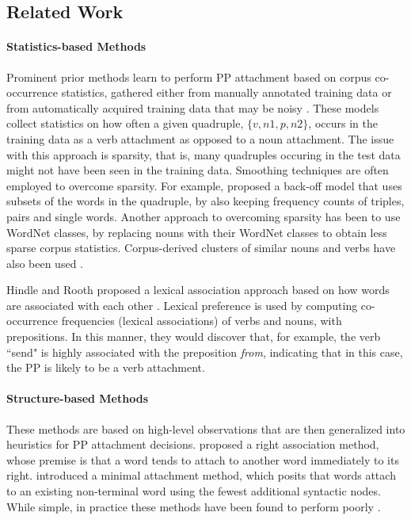\subsection{Related Work}
\paragraph{Statistics-based Methods}
Prominent  prior methods learn to perform PP attachment based on corpus co-occurrence statistics,  gathered either from  manually annotated training data \cite{Collins95,BrillR94} or from  automatically acquired  training data that may be noisy \cite{Ratnaparkhi98,PantelL00}.  These models collect statistics on how often a given quadruple, $\{v,n1,p,n2\}$, occurs in the training data as a verb attachment as opposed to a noun attachment.  The issue with this approach is sparsity, that is, many quadruples occuring in the test data might not have been seen in the training data.
Smoothing techniques are often employed to overcome sparsity.  For example, \cite{Collins95} proposed a back-off model that uses  subsets of the words in the quadruple, by also keeping  frequency counts of triples, pairs and single words. 
Another approach to overcoming sparsity has been to use WordNet \cite{fellbaum98wordnet} classes, by replacing nouns with their WordNet classes \cite{Stetina97,ToutanovaMN04} to obtain less sparse corpus statistics.  Corpus-derived clusters of similar  nouns and verbs have also been used  \cite{PantelL00}.

Hindle and Rooth  proposed a lexical association approach based on how words are associated with each other \cite{HindleR93}. Lexical preference is used by  computing co-occurrence
frequencies (lexical associations) of verbs and nouns,  with prepositions. In this manner, they would discover that, for example,  the verb ``send" is highly associated with the preposition \textit{from},  indicating that in this case, the PP  is likely to be a verb attachment. 


\paragraph{Structure-based Methods}
These methods are based on  high-level  observations that are then generalized into heuristics for 
 PP attachment decisions. \cite{Kimball73}  proposed a right association method, whose premise is that a word tends to attach to another word immediately to its right.
\cite{Frazier78} introduced a minimal attachment method, which posits that  words attach to an existing non-terminal word using the fewest additional syntactic nodes. 
While simple, in practice these methods have been found to perform poorly \cite{WhittemoreFB90}.

